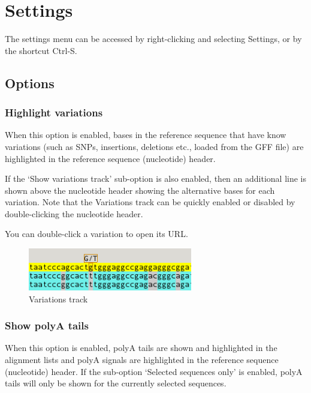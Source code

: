\documentclass[letterpaper]{article}
\begin{document}
\bigskip

{\color[rgb]{0.0,0.27058825,0.5254902}\section[Settings]{Settings}}
\hypertarget{RefHeading2221056909880}{}
The settings menu can be accessed by right-clicking and selecting Settings, or by the shortcut Ctrl-S.

{\color[rgb]{0.30980393,0.5058824,0.7411765}\subsection[Features]{Options}}
\hypertarget{RefHeading2241056909880}{}
{\color[rgb]{0.30980393,0.5058824,0.7411765}\subsubsection[Highlight variations]{Highlight variations}}
\hypertarget{RefHeading2261056909880}{}
When this option is enabled, bases in the reference sequence that have know variations (such as SNPs, insertions, deletions etc., loaded from the GFF file) are highlighted in the reference sequence (nucleotide) header.

\bigskip

If the {\textquoteleft}Show variations track{\textquoteright} sub-option is also enabled, then an additional line is shown above the nucleotide header showing the alternative bases for each variation. Note that the Variations track can be quickly enabled or disabled by double-clicking the nucleotide header.

\bigskip

You can double-click a variation to open its URL.

\begin{figure}
\centering
\color[rgb]{0.30980393,0.5058824,0.7411765}
\includegraphics[width=7.181cm,height=1.852cm]{img_view_variations.png}
\caption{Variations track}
\end{figure}

\bigskip

{\color[rgb]{0.30980393,0.5058824,0.7411765}\subsubsection[Show polyA tails]{Show polyA tails}}
\hypertarget{RefHeading2281056909880}{}
When this option is enabled, polyA tails are shown and highlighted in the alignment lists and polyA signals are highlighted in the reference sequence (nucleotide) header. If the sub-option {\textquoteleft}Selected sequences only{\textquoteright} is enabled, polyA tails will only be shown for the currently selected sequences.
\end{document}
